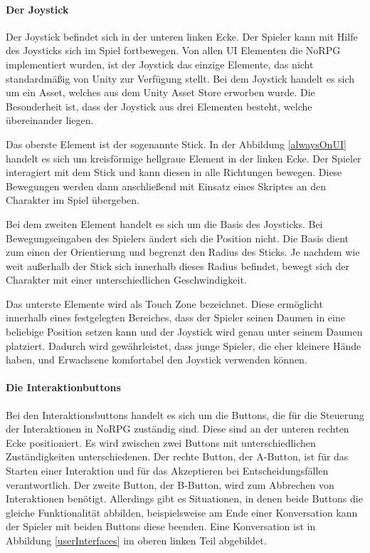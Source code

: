 			\paragraph{Der Joystick}
				Der Joystick befindet sich in der unteren linken Ecke. Der Spieler kann mit Hilfe des Joysticks sich im Spiel fortbewegen. Von allen UI Elementen die NoRPG implementiert wurden, ist der Joystick das einzige Elemente, das nicht standardmäßig von Unity zur Verfügung stellt. Bei dem Joystick handelt es sich um ein Asset, welches aus dem Unity Asset Store erworben wurde. Die Besonderheit ist, dass der Joystick aus drei Elementen besteht, welche übereinander liegen. 
				
				Das oberste Element ist der sogenannte Stick. In der Abbildung \ref{alwaysOnUI} handelt es sich um kreisförmige hellgraue Element in der linken Ecke. Der Spieler interagiert mit dem Stick und kann diesen in alle Richtungen bewegen. Diese Bewegungen werden dann anschließend mit Einsatz eines Skriptes an den Charakter im Spiel übergeben. 
				
				Bei dem zweiten Element handelt es sich um die Basis des Joysticks. Bei Bewegungseingaben des Spielers ändert sich die Position nicht. Die Basis dient zum einen der Orientierung und begrenzt den Radius des Sticks. Je nachdem wie weit außerhalb der Stick sich innerhalb dieses Radius befindet, bewegt sich der Charakter mit einer unterschiedlichen Geschwindigkeit.
				
				Das unterste Elemente wird als Touch Zone bezeichnet. Diese ermöglicht innerhalb eines festgelegten Bereiches, dass der Spieler seinen Daumen in eine beliebige Position setzen kann und der Joystick wird genau unter seinem Daumen platziert. Dadurch wird gewährleistet, dass junge Spieler, die eher kleinere Hände haben, und Erwachsene komfortabel den Joystick verwenden können.
				
			\paragraph{Die Interaktionbuttons}
				Bei den Interaktionsbuttons handelt es sich um die Buttons, die für die Steuerung der Interaktionen in NoRPG zuständig sind. Diese sind an der unteren rechten Ecke positioniert. Es wird zwischen zwei Buttons mit unterschiedlichen Zuständigkeiten unterschiedenen. Der rechte Button, der A-Button, ist für das Starten einer Interaktion und für das Akzeptieren bei Entscheidungsfällen verantwortlich. Der zweite Button, der B-Button, wird zum Abbrechen von Interaktionen benötigt. Allerdings gibt es Situationen, in denen beide Buttons die gleiche Funktionalität abbilden, beispielsweise am Ende einer Konversation kann der Spieler mit beiden Buttons diese beenden. Eine Konversation ist in Abbildung \ref{userInterfaces} im oberen linken Teil abgebildet.
				
